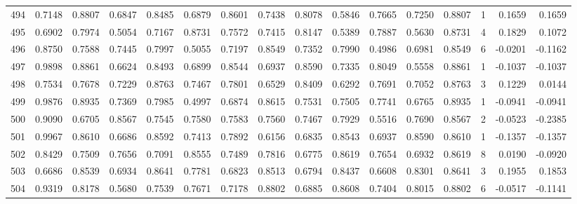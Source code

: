 \begin{tabular}{lrrrrrrrrrrrrrrr}
494 &      0.7148 &  0.8807 &  0.6847 &  0.8485 &  0.6879 &  0.8601 &  0.7438 &  0.8078 &  0.5846 &  0.7665 &   0.7250 &     0.8807 &      1 &                    0.1659 &                     0.1659 \\
495 &      0.6902 &  0.7974 &  0.5054 &  0.7167 &  0.8731 &  0.7572 &  0.7415 &  0.8147 &  0.5389 &  0.7887 &   0.5630 &     0.8731 &      4 &                    0.1829 &                     0.1072 \\
496 &      0.8750 &  0.7588 &  0.7445 &  0.7997 &  0.5055 &  0.7197 &  0.8549 &  0.7352 &  0.7990 &  0.4986 &   0.6981 &     0.8549 &      6 &                   -0.0201 &                    -0.1162 \\
497 &      0.9898 &  0.8861 &  0.6624 &  0.8493 &  0.6899 &  0.8544 &  0.6937 &  0.8590 &  0.7335 &  0.8049 &   0.5558 &     0.8861 &      1 &                   -0.1037 &                    -0.1037 \\
498 &      0.7534 &  0.7678 &  0.7229 &  0.8763 &  0.7467 &  0.7801 &  0.6529 &  0.8409 &  0.6292 &  0.7691 &   0.7052 &     0.8763 &      3 &                    0.1229 &                     0.0144 \\
499 &      0.9876 &  0.8935 &  0.7369 &  0.7985 &  0.4997 &  0.6874 &  0.8615 &  0.7531 &  0.7505 &  0.7741 &   0.6765 &     0.8935 &      1 &                   -0.0941 &                    -0.0941 \\
500 &      0.9090 &  0.6705 &  0.8567 &  0.7545 &  0.7580 &  0.7583 &  0.7560 &  0.7467 &  0.7929 &  0.5516 &   0.7690 &     0.8567 &      2 &                   -0.0523 &                    -0.2385 \\
501 &      0.9967 &  0.8610 &  0.6686 &  0.8592 &  0.7413 &  0.7892 &  0.6156 &  0.6835 &  0.8543 &  0.6937 &   0.8590 &     0.8610 &      1 &                   -0.1357 &                    -0.1357 \\
502 &      0.8429 &  0.7509 &  0.7656 &  0.7091 &  0.8555 &  0.7489 &  0.7816 &  0.6775 &  0.8619 &  0.7654 &   0.6932 &     0.8619 &      8 &                    0.0190 &                    -0.0920 \\
503 &      0.6686 &  0.8539 &  0.6934 &  0.8641 &  0.7781 &  0.6823 &  0.8513 &  0.6794 &  0.8437 &  0.6608 &   0.8301 &     0.8641 &      3 &                    0.1955 &                     0.1853 \\
504 &      0.9319 &  0.8178 &  0.5680 &  0.7539 &  0.7671 &  0.7178 &  0.8802 &  0.6885 &  0.8608 &  0.7404 &   0.8015 &     0.8802 &      6 &                   -0.0517 &                    -0.1141 \\

\end{tabular}
